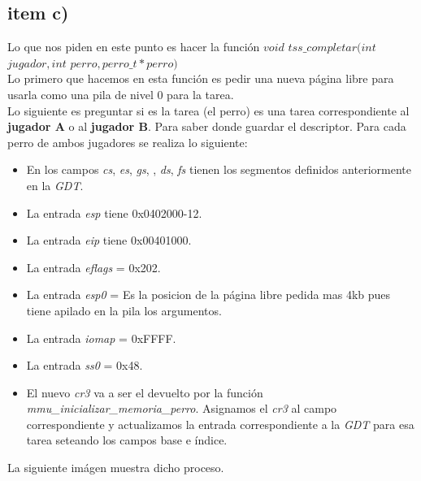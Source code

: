 \subsection{item c)}
Lo que nos piden en este punto es hacer la función $void$ $tss\_completar(int$ $jugador, int$ $perro, perro\_t *perro)$\\
Lo primero que  hacemos en esta función es pedir una nueva página libre para usarla como una pila de nivel 0 para la tarea.\\
Lo siguiente es preguntar si es la tarea (el perro) es una tarea correspondiente al \textbf{jugador A} o al \textbf{jugador B}. Para saber donde guardar el descriptor. Para cada perro de ambos jugadores se realiza lo siguiente:
\begin{itemize}

\item En los campos \textit{cs}, \textit{es}, \textit{gs}, , \textit{ds}, \textit{fs} tienen los segmentos definidos anteriormente en la \textit{GDT}.\\
\item La entrada \textit{esp} tiene 0x0402000-12.\\
\item La entrada \textit{eip} tiene 0x00401000.\\
\item La entrada \textit{eflags} = 0x202.\\
\item La entrada \textit{esp0} = Es la posicion de la página libre pedida mas 4kb pues tiene apilado en la pila los argumentos.\\
\item La entrada \textit{iomap} = 0xFFFF.\\
\item La entrada \textit{ss0} = 0x48.\\
\item El nuevo \textit{cr3} va a ser el devuelto por la función \textit{mmu\_inicializar\_memoria\_perro}. Asignamos el \textit{cr3}  al campo correspondiente y actualizamos la entrada correspondiente a la \textit{GDT} para esa tarea seteando los campos base e índice.
\end{itemize}

La siguiente imágen muestra dicho proceso.\\

